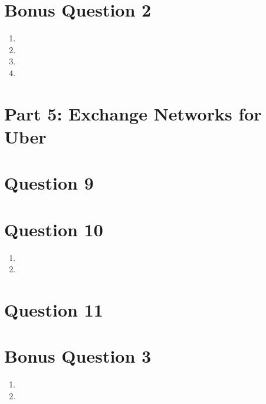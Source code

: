 \documentclass{article}
\begin{document}
\section{Bonus Question 2}

\begin{enumerate}[label=(\alph*)]

    \item 

    
    \item 


    \item 

    
    \item 


\end{enumerate}

\section*{Part 5: Exchange Networks for Uber}
\setcounter{section}{0}


\section{Question 9}

\section{Question 10}

\begin{enumerate}[label=(\alph*)]

    \item 

    
    \item 


\end{enumerate}


\section{Question 11}

\section{Bonus Question 3}

\begin{enumerate}[label=(\alph*)]

    \item 

    
    \item 

\end{enumerate}


\end{document}
